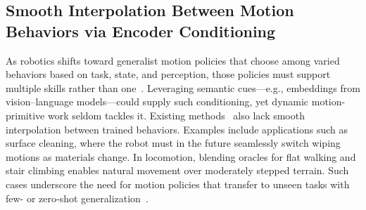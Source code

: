 \subsection{Smooth Interpolation Between Motion Behaviors via Encoder Conditioning}
As robotics shifts toward generalist motion policies that choose among varied behaviors based on task, state, and perception, those policies must support multiple skills rather than one~\citep{o2024open, black2024pi0, gemini2025robotics}. Leveraging semantic cues—e.g., embeddings from vision–language models—could supply such conditioning, yet dynamic motion-primitive work seldom tackles it. Existing methods~\citep{rana2020euclideanizing, perez2023stable, perez2024puma, sochopoulos2024learning, zhi2024teaching} also lack smooth interpolation between trained behaviors.
Examples include applications such as surface cleaning, where the robot must in the future seamlessly switch wiping motions as materials change. In locomotion, blending oracles for flat walking and stair climbing enables natural movement over moderately stepped terrain. Such cases underscore the need for motion policies that transfer to unseen tasks with few- or zero-shot generalization~\citep{jaquier2025transfer}.

